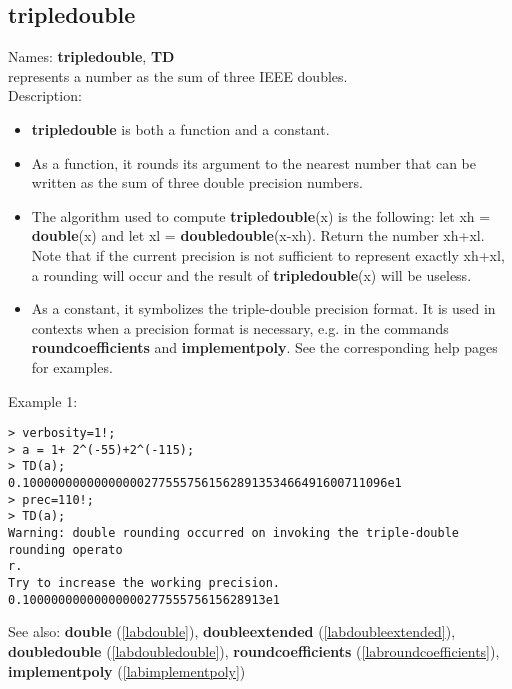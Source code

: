 \subsection{tripledouble}
\label{labtripledouble}
\noindent Names: \textbf{tripledouble}, \textbf{TD}\\
represents a number as the sum of three IEEE doubles.\\

\noindent Description: \begin{itemize}

\item \textbf{tripledouble} is both a function and a constant.

\item As a function, it rounds its argument to the nearest number that can be written
   as the sum of three double precision numbers.

\item The algorithm used to compute \textbf{tripledouble}(x) is the following: let xh = \textbf{double}(x)
   and let xl = \textbf{doubledouble}(x-xh). Return the number xh+xl. Note that if the
   current precision is not sufficient to represent exactly xh+xl, a rounding will
   occur and the result of \textbf{tripledouble}(x) will be useless.

\item As a constant, it symbolizes the triple-double precision format. It is used in 
   contexts when a precision format is necessary, e.g. in the commands 
   \textbf{roundcoefficients} and \textbf{implementpoly}.
   See the corresponding help pages for examples.
\end{itemize}
\noindent Example 1: 
\begin{center}\begin{minipage}{15cm}\begin{Verbatim}[frame=single]
> verbosity=1!;
> a = 1+ 2^(-55)+2^(-115);
> TD(a);
0.100000000000000002775557561562891353466491600711096e1
> prec=110!;
> TD(a);
Warning: double rounding occurred on invoking the triple-double rounding operato
r.
Try to increase the working precision.
0.1000000000000000027755575615628913e1
\end{Verbatim}
\end{minipage}\end{center}
See also: \textbf{double} (\ref{labdouble}), \textbf{doubleextended} (\ref{labdoubleextended}), \textbf{doubledouble} (\ref{labdoubledouble}), \textbf{roundcoefficients} (\ref{labroundcoefficients}), \textbf{implementpoly} (\ref{labimplementpoly})

